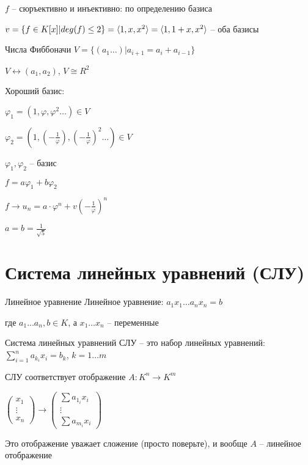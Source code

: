 \documentclass[12pt]{article}
\begin{document}
$f$ -- сюръективно и инъективно: по определению базиса

\begin{Example}{}
    $v = \{ f \in K[x] | deg(f) \leq 2 \} = \langle 1, x, x^2 \rangle = \langle 1, 1 + x, x^2 \rangle$ -- оба базисы
\end{Example}

\begin{Example}{Числа Фиббоначи}
    $V = \{ (a_1 \ldots) | a_{i + 1} = a_i + a_{i - 1} \}$

    $V \leftrightarrow (a_1, a_2)$, $V \cong R^2$

    Хороший базис:

    $\varphi_1 = (1, \varphi, \varphi^2 \ldots) \in V$

    $\varphi_2 = (1, (-\frac{1}{\varphi}), (-\frac{1}{\varphi})^2 \ldots) \in V$

    $\varphi_1, \varphi_2$ -- базис

    $f = a\varphi_1 + b\varphi_2$

    $f \rightarrow u_n = a \cdot \varphi^n + v(-\frac{1}{\varphi})^n$

    $a = b = \frac{1}{\sqrt{5}}$
\end{Example}

\section{Система линейных уравнений (СЛУ)}

\begin{defin}{Линейное уравнение}
    Линейное уравнение: $a_1x_1 \ldots a_nx_n = b$
    
    где $a_1 \ldots a_n, b \in K$, а $x_1 \ldots x_n$ -- переменные
\end{defin}

\begin{defin}{Система линейных уравнений}
    СЛУ -- это набор линейных уравнений: $\sum\limits_{i = 1}^n a_{k_i}x_i = b_k$, $k = 1 \ldots m$

    СЛУ соответствует отображение $A: K^n \rightarrow K^m$

    $\left( \begin{gathered}
        x_1 \\
        \vdots \\
        x_n
    \end{gathered} \right) \rightarrow \left( \begin{gathered}
        \sum a_{1_i}x_i \\
        \vdots \\
        \sum a_{m_i}x_i
    \end{gathered} \right)$

    Это отображение уважает сложение (просто поверьте), и вообще $A$ -- линейное отображение
\end{defin}
\end{document}
